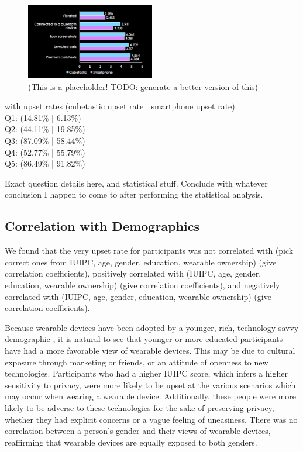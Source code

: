 \documentclass{acm_proc_article-sp}
\begin{document}
\begin{figure}
	\centering
	\includegraphics[width=0.5\textwidth]{device-type.png}
	\caption{(This is a placeholder! TODO: generate a better version of this)}
\end{figure}

with upset rates (cubetastic upset rate | smartphone upset rate)\\
Q1: (14.81\% | 6.13\%)\\
Q2: (44.11\% | 19.85\%)\\
Q3: (87.09\% | 58.44\%)\\
Q4: (52.77\% | 55.79\%)\\
Q5: (86.49\% | 91.82\%) 

Exact question details here, and statistical stuff. Conclude with whatever conclusion I happen to come to after performing the statistical analysis. 

\subsection{Correlation with Demographics}
We found that the very upset rate for participants was not correlated with (pick correct ones from IUIPC, age, gender, education, wearable ownership) (give correlation coefficients), positively correlated with  (IUIPC, age, gender, education, wearable ownership) (give correlation coefficients), and negatively correlated with  (IUIPC, age, gender, education, wearable ownership) (give correlation coefficients). 

Because wearable devices have been adopted by a younger, rich, technology-savvy demographic  \cite{cmo}, it is natural to see that younger or more educated participants have had a more favorable view of wearable devices. This may be due to cultural exposure through marketing or friends, or an attitude of openness to new technologies. Participants who had a higher IUIPC score, which infers a higher sensitivity to privacy, were more likely to be upset at the various scenarios which may occur when wearing a wearable device. Additionally, these people were more likely to be adverse to these technologies for the sake of preserving privacy, whether they had explicit concerns or a vague feeling of uneasiness. There was no correlation between a person's gender and their views of wearable devices, reaffirming that wearable devices are equally exposed to both genders. 
\end{document}
